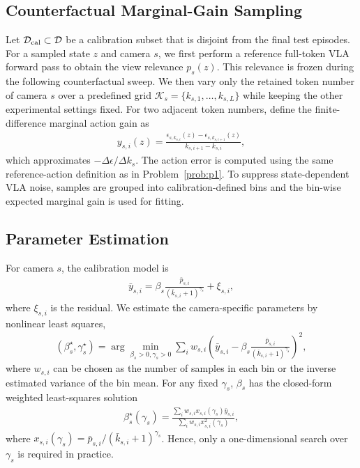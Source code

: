 \documentclass[lettersize,journal]{IEEEtran}
\theoremstyle{custom}
\begin{document}
\subsection{Counterfactual Marginal-Gain Sampling}
Let $\mathcal D_{\rm cal}\subset\mathcal D$ be a calibration subset that is disjoint from the final test episodes. For a sampled state $z$ and camera $s$, we first perform a reference full-token VLA forward pass to obtain the view relevance $p_s(z)$. This relevance is frozen during the following counterfactual sweep. We then vary only the retained token number of camera $s$ over a predefined grid $\mathcal K_s=\{k_{s,1},\ldots,k_{s,L}\}$ while keeping the other experimental settings fixed. For two adjacent token numbers, define the finite-difference marginal action gain as
\begin{align}\label{eq:cal_marginal}
    y_{s,i}(z)
    =\frac{\epsilon_{s,k_{s,i}}(z)-\epsilon_{s,k_{s,i+1}}(z)}
    {k_{s,i+1}-k_{s,i}},
\end{align}
which approximates $-\Delta\epsilon/\Delta k_s$. The action error is computed using the same reference-action definition as in Problem~\ref{prob:p1}. To suppress state-dependent VLA noise, samples are grouped into calibration-defined bins and the bin-wise expected marginal gain is used for fitting.

\subsection{Parameter Estimation}
For camera $s$, the calibration model is
\begin{align}\label{eq:cal_fit}
    \bar y_{s,i}
    =\beta_s\frac{\bar p_{s,i}}{(\bar k_{s,i}+1)^{\gamma_s}}+\xi_{s,i},
\end{align}
where $\xi_{s,i}$ is the residual. We estimate the camera-specific parameters by nonlinear least squares,
\begin{align}\label{eq:cal_nls}
    (\beta_s^\star,\gamma_s^\star)
    =\arg\min_{\beta_s>0,\gamma_s>0}
    \sum_i w_{s,i}
    \left(
    \bar y_{s,i}-
    \beta_s\frac{\bar p_{s,i}}{(\bar k_{s,i}+1)^{\gamma_s}}
    \right)^2,
\end{align}
where $w_{s,i}$ can be chosen as the number of samples in each bin or the inverse estimated variance of the bin mean. For any fixed $\gamma_s$, $\beta_s$ has the closed-form weighted least-squares solution
\begin{align}\label{eq:beta_closed}
    \beta_s^\star(\gamma_s)
    =\frac{\sum_i w_{s,i}x_{s,i}(\gamma_s)\bar y_{s,i}}
    {\sum_i w_{s,i}x_{s,i}^2(\gamma_s)},
\end{align}
where $x_{s,i}(\gamma_s)=\bar p_{s,i}/(\bar k_{s,i}+1)^{\gamma_s}$. Hence, only a one-dimensional search over $\gamma_s$ is required in practice.
\end{document}
